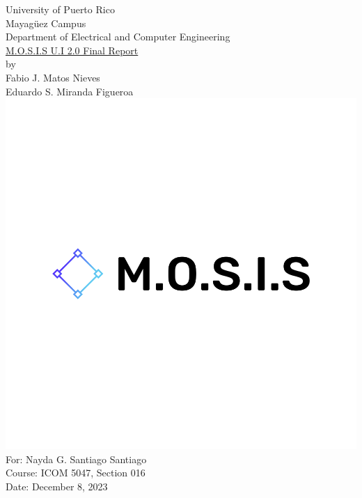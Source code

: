 \linespread{1.0}
\begin{titlepage}
	\begin{center}
		\large{University of Puerto Rico\\
			Mayagüez Campus\\
			\vspace{\baselineskip}
			Department of Electrical and Computer Engineering}\\
		\vspace{5\baselineskip}
		\Huge{\underline{M.O.S.I.S U.I 2.0 Final Report}\\}
		\vspace{\baselineskip}
		\large by\\
		Fabio J. Matos Nieves\\
		Eduardo S. Miranda Figueroa\\
		\normalsize
		\includegraphics[scale=0.15]{../../M.O.S.I.S Logo/default.png}\\
		\vspace{4\baselineskip}
		\large
		For: Nayda G. Santiago Santiago\\
		Course: ICOM 5047, Section 016\\
		Date: December 8, 2023\\
		\normalsize

	\end{center}
\end{titlepage}